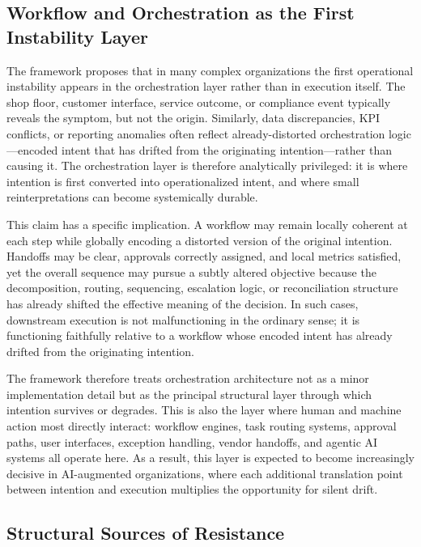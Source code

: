 \documentclass[12pt]{article}
\begin{document}
\subsection{Workflow and Orchestration as the First Instability Layer}
\label{sec:orchestration_instability}

The framework proposes that in many complex organizations the first
operational instability appears in the orchestration layer rather than in
execution itself. The shop floor, customer interface, service outcome, or
compliance event typically reveals the symptom, but not the origin. Similarly,
data discrepancies, KPI conflicts, or reporting anomalies often reflect
already-distorted orchestration logic---encoded intent that has drifted from
the originating intention---rather than causing it. The orchestration layer is
therefore analytically privileged: it is where intention is first converted
into operationalized intent, and where small reinterpretations can become
systemically durable.

This claim has a specific implication. A workflow may remain locally coherent
at each step while globally encoding a distorted version of the original
intention. Handoffs may be clear, approvals correctly assigned, and local
metrics satisfied, yet the overall sequence may pursue a subtly altered
objective because the decomposition, routing, sequencing, escalation logic, or
reconciliation structure has already shifted the effective meaning of the
decision. In such cases, downstream execution is not malfunctioning in the
ordinary sense; it is functioning faithfully relative to a workflow whose
encoded intent has already drifted from the originating intention.

The framework therefore treats orchestration architecture not as a minor
implementation detail but as the principal structural layer through which
intention survives or degrades. This is also the layer where human and machine
action most directly interact: workflow engines, task routing systems,
approval paths, user interfaces, exception handling, vendor handoffs, and
agentic AI systems all operate here. As a result, this layer is expected to
become increasingly decisive in AI-augmented organizations, where each
additional translation point between intention and execution multiplies the
opportunity for silent drift.

\subsection{Structural Sources of Resistance}
\label{sec:resistance_sources}
\end{document}
